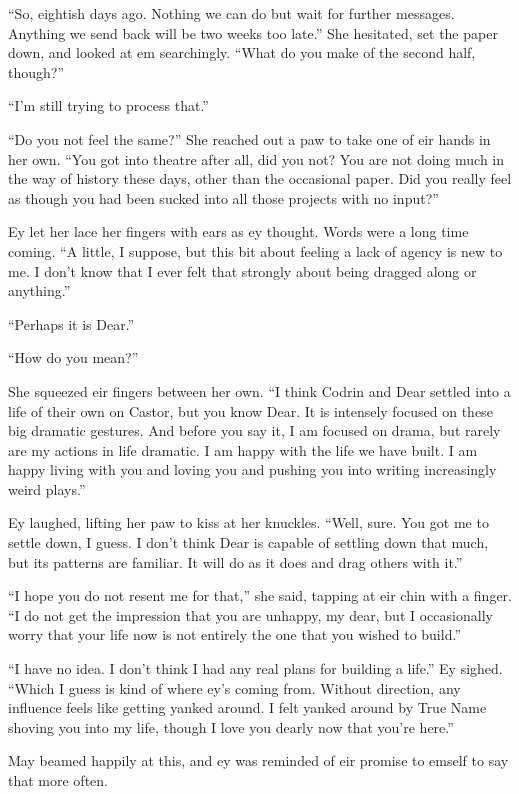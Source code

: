 ``So, eightish days ago. Nothing we can do but wait for further messages. Anything we send back will be two weeks too late.'' She hesitated, set the paper down, and looked at em searchingly. ``What do you make of the second half, though?''

``I'm still trying to process that.''

``Do you not feel the same?'' She reached out a paw to take one of eir hands in her own. ``You got into theatre after all, did you not? You are not doing much in the way of history these days, other than the occasional paper. Did you really feel as though you had been sucked into all those projects with no input?''

Ey let her lace her fingers with ears as ey thought. Words were a long time coming. ``A little, I suppose, but this bit about feeling a lack of agency is new to me. I don't know that I ever felt that strongly about being dragged along or anything.''

``Perhaps it is Dear.''

``How do you mean?''

She squeezed eir fingers between her own. ``I think Codrin and Dear settled into a life of their own on Castor, but you know Dear. It is intensely focused on these big dramatic gestures. And before you say it, I am focused on drama, but rarely are my actions in life dramatic. I am happy with the life we have built. I am happy living with you and loving you and pushing you into writing increasingly weird plays.''

Ey laughed, lifting her paw to kiss at her knuckles. ``Well, sure. You got me to settle down, I guess. I don't think Dear is capable of settling down that much, but its patterns are familiar. It will do as it does and drag others with it.''

``I hope you do not resent me for that,'' she said, tapping at eir chin with a finger. ``I do not get the impression that you are unhappy, my dear, but I occasionally worry that your life now is not entirely the one that you wished to build.''

``I have no idea. I don't think I had any real plans for building a life.'' Ey sighed. ``Which I guess is kind of where ey's coming from. Without direction, any influence feels like getting yanked around. I felt yanked around by True Name shoving you into my life, though I love you dearly now that you're here.''

May beamed happily at this, and ey was reminded of eir promise to emself to say that more often.


